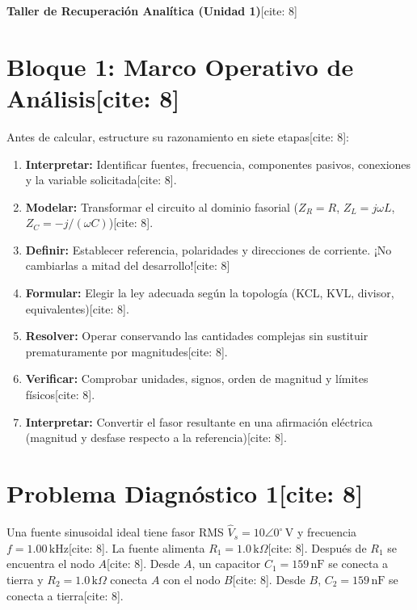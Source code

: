 \documentclass[11pt, a4paper]{article}
\begin{document}
\begin{center}
    \Large\textbf{\textcolor{ucbblue}{Taller de Recuperación Analítica (Unidad 1)}}[cite: 8]
\end{center}

\section*{Bloque 1: Marco Operativo de Análisis[cite: 8]}
Antes de calcular, estructure su razonamiento en siete etapas[cite: 8]:
\begin{enumerate}
    \item \textbf{Interpretar:} Identificar fuentes, frecuencia, componentes pasivos, conexiones y la variable solicitada[cite: 8].
    \item \textbf{Modelar:} Transformar el circuito al dominio fasorial ($Z_R=R$, $Z_L=j\omega L$, $Z_C=-j/(\omega C)$)[cite: 8].
    \item \textbf{Definir:} Establecer referencia, polaridades y direcciones de corriente. ¡No cambiarlas a mitad del desarrollo![cite: 8]
    \item \textbf{Formular:} Elegir la ley adecuada según la topología (KCL, KVL, divisor, equivalentes)[cite: 8].
    \item \textbf{Resolver:} Operar conservando las cantidades complejas sin sustituir prematuramente por magnitudes[cite: 8].
    \item \textbf{Verificar:} Comprobar unidades, signos, orden de magnitud y límites físicos[cite: 8].
    \item \textbf{Interpretar:} Convertir el fasor resultante en una afirmación eléctrica (magnitud y desfase respecto a la referencia)[cite: 8].
\end{enumerate}

\vspace{0.4cm}
\section*{Problema Diagnóstico 1[cite: 8]}
\begin{sloppypar}
Una fuente sinusoidal ideal tiene fasor RMS $\hat{V}_s = 10\angle0^\circ\,\text{V}$ y frecuencia $f = 1.00\,\text{kHz}$[cite: 8]. La fuente alimenta $R_1 = 1.0\,\text{k}\Omega$[cite: 8]. Después de $R_1$ se encuentra el nodo $A$[cite: 8]. Desde $A$, un capacitor $C_1 = 159\,\text{nF}$ se conecta a tierra y $R_2 = 1.0\,\text{k}\Omega$ conecta $A$ con el nodo $B$[cite: 8]. Desde $B$, $C_2 = 159\,\text{nF}$ se conecta a tierra[cite: 8].
\end{sloppypar}
\end{document}
